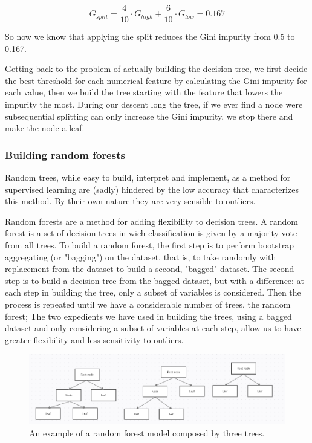 \documentclass[a4paper]{report}
\begin{document}
\begin{equation}
    G_{split} = \frac{4}{10} \cdot G_{high} + \frac{6}{10} \cdot G_{low} = 0.167
\end{equation}

So now we know that applying the split reduces the Gini impurity from 0.5 to 0.167.

Getting back to the problem of actually building the decision tree, we first decide the best threshold for each numerical feature by calculating the Gini impurity for each value, then we build the tree starting with the feature that lowers the impurity the most. During our descent long the tree, if we ever find a node were subsequential splitting can only increase the Gini impurity, we stop there and make the node a leaf.

\subsubsection{Building random forests}
Random trees, while easy to build, interpret and implement, as a method for supervised learning are (sadly) hindered by the low accuracy that characterizes this method. By their own nature they are very sensible to outliers.

Random forests are a method for adding flexibility to decision trees. A random forest is a set of decision trees in wich classification is given by a majority vote from all trees. To build a random forest, the first step is to perform bootstrap aggregating (or "bagging") on the dataset, that is, to take randomly with replacement from the dataset to build a second, "bagged" dataset. The second step is to build a decision tree from the bagged dataset, but with a difference: at each step in building the tree, only a subset of variables is considered. Then the process is repeated until we have a considerable number of trees, the random forest; The two expedients we have used in building the trees, using a bagged dataset and only considering a subset of variables at each step, allow us to have greater flexibility and less sensitivity to outliers.

\begin{figure} [H]
\centering
\includegraphics [width=\textwidth ] {o/forest.png}
\caption{An example of a random forest model composed by three trees.}
\label{forest}
\end{figure}
\end{document}
